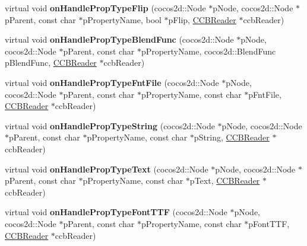 \begin{DoxyCompactItemize}
virtual void {\bfseries on\+Handle\+Prop\+Type\+Flip} (cocos2d\+::\+Node $\ast$p\+Node, cocos2d\+::\+Node $\ast$p\+Parent, const char $\ast$p\+Property\+Name, bool $\ast$p\+Flip, \hyperlink{classcocosbuilder_1_1CCBReader}{C\+C\+B\+Reader} $\ast$ccb\+Reader)
\item 
\mbox{\label{classcocosbuilder_1_1NodeLoader_af9fd25689164688af528603f26cc2d42}} 
virtual void {\bfseries on\+Handle\+Prop\+Type\+Blend\+Func} (cocos2d\+::\+Node $\ast$p\+Node, cocos2d\+::\+Node $\ast$p\+Parent, const char $\ast$p\+Property\+Name, cocos2d\+::\+Blend\+Func p\+Blend\+Func, \hyperlink{classcocosbuilder_1_1CCBReader}{C\+C\+B\+Reader} $\ast$ccb\+Reader)
\item 
\mbox{\label{classcocosbuilder_1_1NodeLoader_a6fd12a9f7123a963c23fcadc753c5331}} 
virtual void {\bfseries on\+Handle\+Prop\+Type\+Fnt\+File} (cocos2d\+::\+Node $\ast$p\+Node, cocos2d\+::\+Node $\ast$p\+Parent, const char $\ast$p\+Property\+Name, const char $\ast$p\+Fnt\+File, \hyperlink{classcocosbuilder_1_1CCBReader}{C\+C\+B\+Reader} $\ast$ccb\+Reader)
\item 
\mbox{\label{classcocosbuilder_1_1NodeLoader_a58c56f852415c8e9655022957022cc8a}} 
virtual void {\bfseries on\+Handle\+Prop\+Type\+String} (cocos2d\+::\+Node $\ast$p\+Node, cocos2d\+::\+Node $\ast$p\+Parent, const char $\ast$p\+Property\+Name, const char $\ast$p\+String, \hyperlink{classcocosbuilder_1_1CCBReader}{C\+C\+B\+Reader} $\ast$ccb\+Reader)
\item 
\mbox{\label{classcocosbuilder_1_1NodeLoader_a7bc716e1c139ce8c8de7ddf6dd222709}} 
virtual void {\bfseries on\+Handle\+Prop\+Type\+Text} (cocos2d\+::\+Node $\ast$p\+Node, cocos2d\+::\+Node $\ast$p\+Parent, const char $\ast$p\+Property\+Name, const char $\ast$p\+Text, \hyperlink{classcocosbuilder_1_1CCBReader}{C\+C\+B\+Reader} $\ast$ccb\+Reader)
\item 
\mbox{\label{classcocosbuilder_1_1NodeLoader_a2b50c5ec46ba0fccd6406441fbe1d2e7}} 
virtual void {\bfseries on\+Handle\+Prop\+Type\+Font\+T\+TF} (cocos2d\+::\+Node $\ast$p\+Node, cocos2d\+::\+Node $\ast$p\+Parent, const char $\ast$p\+Property\+Name, const char $\ast$p\+Font\+T\+TF, \hyperlink{classcocosbuilder_1_1CCBReader}{C\+C\+B\+Reader} $\ast$ccb\+Reader)

\end{DoxyCompactItemize}
